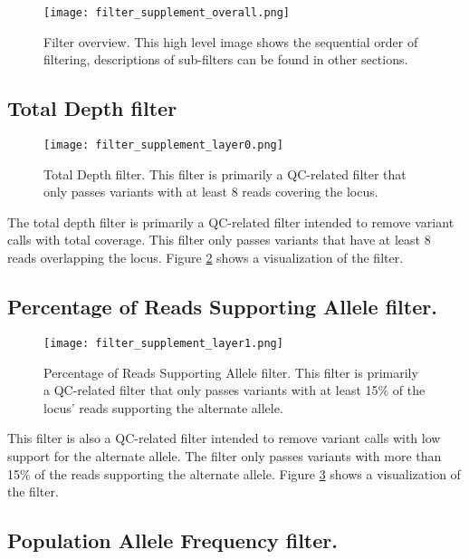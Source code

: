 \documentclass{article}
\begin{document}
\begin{figure}
\centering
\texttt{[image: filter\_supplement\_overall.png]}
\caption{Filter overview.  This high level image shows the sequential order of filtering, descriptions of sub-filters can be found in other sections.}
\label{fig:filter_overview}
\end{figure}

\subsection{Total Depth filter}

\begin{figure}
\centering
\texttt{[image: filter\_supplement\_layer0.png]}
\caption{Total Depth filter.  This filter is primarily a QC-related filter that only passes variants with at least 8 reads covering the locus.}
\label{fig:filter0}
\end{figure}

The total depth filter is primarily a QC-related filter intended to remove variant calls with total coverage.  This filter only passes variants that have at least 8 reads overlapping the locus.  Figure \ref{fig:filter0} shows a visualization of the filter.

\subsection{Percentage of Reads Supporting Allele filter.}

\begin{figure}
\centering
\texttt{[image: filter\_supplement\_layer1.png]}
\caption{Percentage of Reads Supporting Allele filter.  This filter is primarily a QC-related filter that only passes variants with at least 15\% of the locus' reads supporting the alternate allele.}
\label{fig:filter1}
\end{figure}

This filter is also a QC-related filter intended to remove variant calls with low support for the alternate allele.  The filter only passes variants with more than 15\% of the reads supporting the alternate allele.  Figure \ref{fig:filter1} shows a visualization of the filter.

\subsection{Population Allele Frequency filter.}
\end{document}
